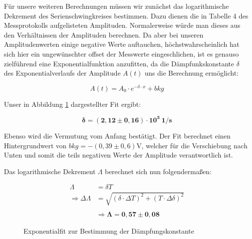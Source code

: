 \documentclass{article}
\begin{document}
Für unsere weiteren Berechnungen müssen wir zunächst das logarithmische Dekrement des Serienschwingkreises bestimmen. Dazu dienen die in Tabelle 4 des Messprotokolls aufgelisteten Amplituden. Normalerweise würde man dieses aus den Verhältnissen der Amplituden berechnen. Da aber bei unseren Amplitudenwerten einige negative Werte auftauchen, höchstwahrscheinlich hat sich hier ein ungewünschter offset der Messwerte eingeschlichen, ist es genauso zielführend eine Exponentialfunktion anzufitten, da die Dämpfunkskonstante $\delta$ des Exponentialverlaufs der Amplitude $A(t)$ uns die Berechnung ermöglicht:

\begin{equation}
    A(t) = A_0 \cdot e^{ - \delta \cdot x } + bkg
\end{equation}

Unser in Abbildung \ref{fig:A4-Dämpfungskonst} dargestellter Fit ergibt:

\begin{equation}
    \bm{\delta = (2,12 \pm 0,16) \cdot 10^{3}} \ \textbf{1/s}
\end{equation}

Ebenso wird die Vermutung vom Anfang bestätigt. Der Fit berechnet einen Hintergrundwert von $bkg=-(0,39\pm0,6)$V, welcher für die Verschiebung nach Unten und somit die teils negativen Werte der Amplitude verantwortlich ist.

Das logarithmische Dekrement $\Lambda$ berechnet sich nun folgendermaßen:

\begin{equation}
    \begin{split}
        \Lambda &= \delta T \\
        \Rightarrow \Delta \Lambda &= \sqrt{(\delta \cdot \Delta T)^2 + (T \cdot \Delta \delta)^2} \\ \\
        &\Rightarrow \bm{\Lambda = 0,57 \pm 0,08}
    \end{split}
\end{equation}

\begin{figure}[!h]
    \centering
    \caption{Exponentialfit zur Bestimmung der Dämpfungskonstante}
    \label{fig:A4-Dämpfungskonst}
\end{figure}
\end{document}
